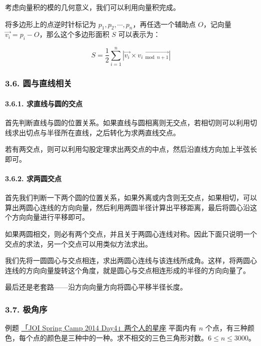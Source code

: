 考虑向量积的模的几何意义，我们可以利用向量积完成。

将多边形上的点逆时针标记为 $p_1,p_2,\cdots ,p_n$，再任选一个辅助点 $O$，记向量 $\vec {v_i}=p_i-O$，那么这个多边形面积 $S$ 可以表示为：

$$
S=\frac{1}{2}\sum_{i=1}^n |\vec {v_i}\times \overrightarrow{v_{i\bmod n+1}}|
$$

\subsubsection{3.6. 圆与直线相关}

\paragraph{3.6.1. 求直线与圆的交点}

首先判断直线与圆的位置关系。如果直线与圆相离则无交点，若相切则可以利用切线求出切点与半径所在直线，之后转化为求两直线交点。

若有两交点，则可以利用勾股定理求出两交点的中点，然后沿直线方向加上半弦长即可。

\paragraph{3.6.2. 求两圆交点}

首先我们判断一下两个圆的位置关系，如果外离或内含则无交点，如果相切，可以算出两圆心连线的方向向量，然后利用两圆半径计算出平移距离，最后将圆心沿这个方向向量进行平移即可。

如果两圆相交，则必有两个交点，并且关于两圆心连线对称。因此下面只说明一个交点的求法，另一个交点可以用类似方法求出。

我们先将一圆圆心与交点相连，求出两圆心连线与该连线所成角。这样，将两圆心连线的方向向量旋转这个角度，就是圆心与交点相连形成的半径的方向向量了。

最后还是老套路——沿方向向量方向将圆心平移半径长度。

\subsubsection{3.7. 极角序}

\begin{NOTE}{例题}{}
\href{https://www.ioi-jp.org/camp/2014/2014-sp-tasks/2014-sp-d4.pdf}{「JOI Spring Camp 2014 Day4」两个人的星座}  
平面内有 $n$ 个点，有三种颜色，每个点的颜色是三种中的一种。求不相交的三色三角形对数。$6\le n\le 3000$。

\end{NOTE}


